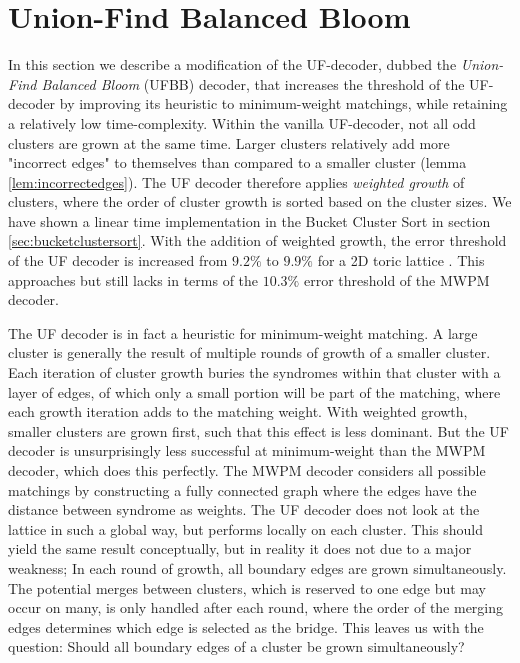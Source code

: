 \section{Union-Find Balanced Bloom}

In this section we describe a modification of the UF-decoder, dubbed the \emph{Union-Find Balanced Bloom} (UFBB) decoder, that increases the threshold of the UF-decoder by improving its heuristic to minimum-weight matchings, while retaining a relatively low time-complexity. Within the vanilla UF-decoder, not all odd clusters are grown at the same time. Larger clusters relatively add more "incorrect edges" to themselves than compared to a smaller cluster (lemma \ref{lem:incorrectedges}). The UF decoder therefore applies \emph{weighted growth} of clusters, where the order of cluster growth is sorted based on the cluster sizes. We have shown a linear time implementation in the Bucket Cluster Sort in section \ref{sec:bucketclustersort}. With the addition of weighted growth, the error threshold of the UF decoder is increased from $9.2\%$ to $9.9\%$ for a 2D toric lattice \cite{delfosse2017almost}. This approaches but still lacks in terms of the $10.3\%$ error threshold of the MWPM decoder.

The UF decoder is in fact a heuristic for minimum-weight matching. A large cluster is generally the result of multiple rounds of growth of a smaller cluster. Each iteration of cluster growth buries the syndromes within that cluster with a layer of edges, of which only a small portion will be part of the matching, where each growth iteration adds to the matching weight. With weighted growth, smaller clusters are grown first, such that this effect is less dominant. But the UF decoder is unsurprisingly less successful at minimum-weight than the MWPM decoder, which does this perfectly. The MWPM decoder considers all possible matchings by constructing a fully connected graph where the edges have the distance between syndrome as weights. The UF decoder does not look at the lattice in such a global way, but performs locally on each cluster. This should yield the same result conceptually, but in reality it does not due to a major weakness; In each round of growth, all boundary edges are grown simultaneously. The potential merges between clusters, which is reserved to one edge but may occur on many, is only handled after each round, where the order of the merging edges determines which edge is selected as the bridge. This leaves us with the question: Should all boundary edges of a cluster be grown simultaneously?

